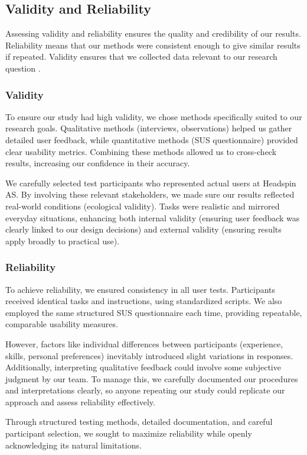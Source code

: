 \subsection{Validity and Reliability}
Assessing validity and reliability ensures the quality and credibility of our results. Reliability means that our methods were consistent enough to give similar results if repeated. Validity ensures that we collected data relevant to our research question \autocite[240-241]{grønmo}.

\subsubsection{Validity}
\label{subsubsec:validity}
To ensure our study had high validity, we chose methods specifically suited to our research goals. Qualitative methods (interviews, observations) helped us gather detailed user feedback, while quantitative methods (SUS questionnaire) provided clear usability metrics. Combining these methods allowed us to cross-check results, increasing our confidence in their accuracy.

We carefully selected test participants who represented actual users at Headspin AS. By involving these relevant stakeholders, we made sure our results reflected real-world conditions (ecological validity). Tasks were realistic and mirrored everyday situations, enhancing both internal validity (ensuring user feedback was clearly linked to our design decisions) and external validity (ensuring results apply broadly to practical use).

\subsubsection{Reliability}
\label{subsubsec:reliability}
To achieve reliability, we ensured consistency in all user tests. Participants received identical tasks and instructions, using standardized scripts. We also employed the same structured SUS questionnaire each time, providing repeatable, comparable usability measures.

However, factors like individual differences between participants (experience, skills, personal preferences) inevitably introduced slight variations in responses. Additionally, interpreting qualitative feedback could involve some subjective judgment by our team. To manage this, we carefully documented our procedures and interpretations clearly, so anyone repeating our study could replicate our approach and assess reliability effectively.

Through structured testing methods, detailed documentation, and careful participant selection, we sought to maximize reliability while openly acknowledging its natural limitations.